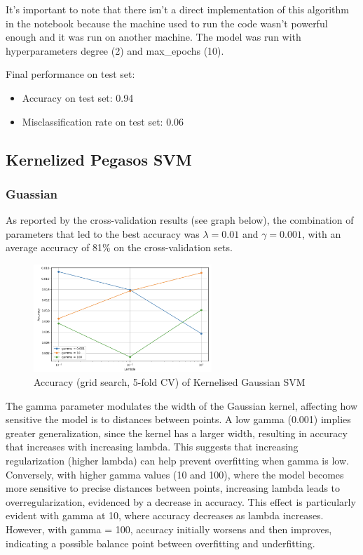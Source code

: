\documentclass[a4paper, 10pt]{article}
\begin{document}
It's important to note that there isn't a direct implementation of this algorithm in the notebook because the machine used to run the code wasn't powerful enough and it was run on another machine. The model was run with hyperparameters degree (2) and max\_epochs (10).

Final performance on test set:
\begin{itemize}
    \item Accuracy on test set: 0.94
    \item Misclassification rate on test set: 0.06
\end{itemize}




\subsection{Kernelized Pegasos SVM}

\subsubsection{Guassian}

As reported by the cross-validation results (see graph below), the combination of parameters that led to the best accuracy was \(\lambda = 0.01\) and \(\gamma = 0.001\), with an average accuracy of 81\% on the cross-validation sets.

\begin{figure}[H]
    \centering
    \includegraphics[width=0.6\textwidth]{images/accKSVMG.png}
    \caption{Accuracy (grid search, 5-fold CV) of Kernelised Gaussian SVM}
    \label{fig:accKSVMG}
\end{figure}

The gamma parameter modulates the width of the Gaussian kernel, affecting how sensitive the model is to distances between points. A low gamma (0.001) implies greater generalization, since the kernel has a larger width, resulting in accuracy that increases with increasing lambda. This suggests that increasing regularization (higher lambda) can help prevent overfitting when gamma is low.
Conversely, with higher gamma values (10 and 100), where the model becomes more sensitive to precise distances between points, increasing lambda leads to overregularization, evidenced by a decrease in accuracy. This effect is particularly evident with gamma at 10, where accuracy decreases as lambda increases. However, with gamma = 100, accuracy initially worsens and then improves, indicating a possible balance point between overfitting and underfitting.
\end{document}
